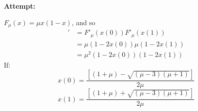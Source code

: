 \documentclass[12pt,letterpaper]{article}
\theoremstyle{definition}
\begin{document}
\textbf{Attempt:}
\begin{changemargin}{.5cm}{0cm}
    $F_\mu (x) = \mu x(1-x)$, and so 
    \begin{align*}
        [F^2_\mu(x(0)) ]' &= F'_\mu(x(0))F'_\mu(x(1))\\
        &=\mu(1-2x(0))\mu(1-2x(1))
        \\
       &=\mu^2(1-2x(0))(1-2x(1))
    \end{align*}
    If:
    \begin{equation*}
        x(0) = \frac{\left[ (1+\mu) -\sqrt{(\mu-3)(\mu+1)} \right]}{2\mu}
    \end{equation*}
    \begin{equation*}
        x(1) = \frac{\left[ (1+\mu) +\sqrt{(\mu-3)(\mu+1)} \right]}{2\mu}
    \end{equation*}


\end{changemargin}
\end{document}
